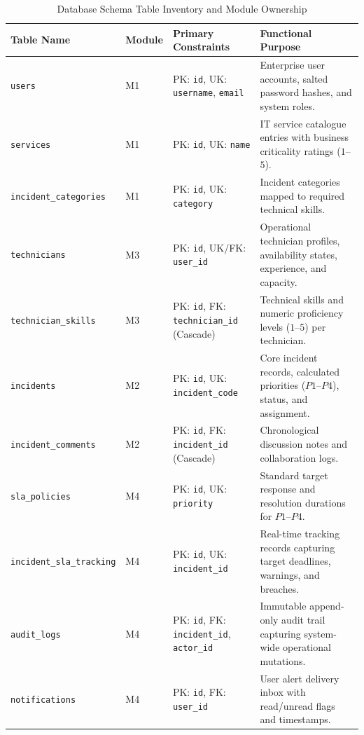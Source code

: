 \documentclass[11pt,a4paper,oneside]{report}
\begin{document}
\begin{table}[H]
\centering
\small
\caption{Database Schema Table Inventory and Module Ownership}
\label{tab:db_inventory}
\begin{tabular}{p{3.2cm}p{1.8cm}p{3.8cm}p{6.0cm}}
\toprule
\textbf{Table Name} & \textbf{Module} & \textbf{Primary Constraints} & \textbf{Functional Purpose} \\
\midrule
\texttt{users} & M1 & PK: \texttt{id}, UK: \texttt{username}, \texttt{email} & Enterprise user accounts, salted password hashes, and system roles. \\
\addlinespace
\texttt{services} & M1 & PK: \texttt{id}, UK: \texttt{name} & IT service catalogue entries with business criticality ratings ($1$--$5$). \\
\addlinespace
\texttt{incident\_categories} & M1 & PK: \texttt{id}, UK: \texttt{category} & Incident categories mapped to required technical skills. \\
\addlinespace
\texttt{technicians} & M3 & PK: \texttt{id}, UK/FK: \texttt{user\_id} & Operational technician profiles, availability states, experience, and capacity. \\
\addlinespace
\texttt{technician\_skills} & M3 & PK: \texttt{id}, FK: \texttt{technician\_id} (Cascade) & Technical skills and numeric proficiency levels ($1$--$5$) per technician. \\
\addlinespace
\texttt{incidents} & M2 & PK: \texttt{id}, UK: \texttt{incident\_code} & Core incident records, calculated priorities ($P1$--$P4$), status, and assignment. \\
\addlinespace
\texttt{incident\_comments} & M2 & PK: \texttt{id}, FK: \texttt{incident\_id} (Cascade) & Chronological discussion notes and collaboration logs. \\
\addlinespace
\texttt{sla\_policies} & M4 & PK: \texttt{id}, UK: \texttt{priority} & Standard target response and resolution durations for $P1$--$P4$. \\
\addlinespace
\texttt{incident\_sla\_tracking} & M4 & PK: \texttt{id}, UK: \texttt{incident\_id} & Real-time tracking records capturing target deadlines, warnings, and breaches. \\
\addlinespace
\texttt{audit\_logs} & M4 & PK: \texttt{id}, FK: \texttt{incident\_id}, \texttt{actor\_id} & Immutable append-only audit trail capturing system-wide operational mutations. \\
\addlinespace
\texttt{notifications} & M4 & PK: \texttt{id}, FK: \texttt{user\_id} & User alert delivery inbox with read/unread flags and timestamps. \\
\bottomrule
\end{tabular}
\end{table}
\end{document}
